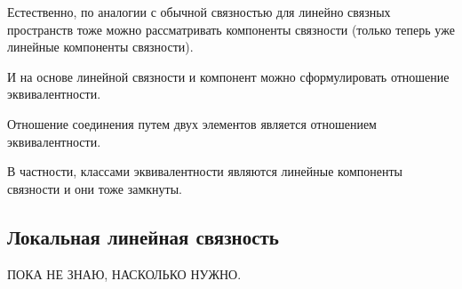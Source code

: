     Естественно, по аналогии с обычной связностью для линейно связных пространств тоже можно рассматривать компоненты связности (только теперь уже линейные компоненты связности). 

 И на основе линейной связности и компонент можно сформулировать отношение эквивалентности.
 \begin{Prop}
   Отношение соединения путем двух элементов является отношением эквивалентности.

   В частности, классами эквивалентности являются линейные компоненты связности и они тоже замкнуты.
\end{Prop}

\subsection{Локальная линейная связность}
ПОКА НЕ ЗНАЮ, НАСКОЛЬКО НУЖНО.
